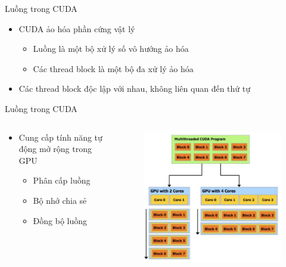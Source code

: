 \documentclass[10pt]{beamer}
\theoremstyle{remark}
\numberwithin{algocf}{section}
\numberwithin{equation}{section}
\numberwithin{dl}{section}
\numberwithin{figure}{section}
\begin{document}
\begin{frame}{Luồng trong CUDA}
    \begin{itemize}
        \item CUDA ảo hóa phần cứng vật lý
        \begin{itemize}
            \item Luồng là một bộ xử lý số vô hướng ảo hóa
            \item Các thread block là một bộ đa xử lý ảo hóa
        \end{itemize}
        \item Các thread block độc lập với nhau, không liên quan đến thứ tự
    \end{itemize}
\end{frame}


\begin{frame}{Luồng trong CUDA}
    \begin{columns}[onlytextwidth]
        \begin{column}{0.5\linewidth}
            \begin{itemize}
                \item Cung cấp tính năng tự động mở rộng trong GPU
                \begin{itemize}
                    \item Phân cấp luồng
                    \item Bộ nhớ chia sẻ
                    \item Đồng bộ luồng
                \end{itemize}
            \end{itemize}
        \end{column}
        \begin{column}{0.5\linewidth}
            \begin{figure}[H]
                \centering
                \includegraphics[width=\linewidth]{figures/CUDA/Multithread_SM.png}

\end{figure}
\end{column}
\end{columns}
\end{frame}
\end{document}
